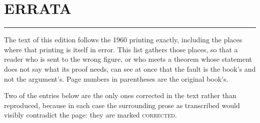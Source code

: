 \documentclass[11pt]{book}
\begin{document}
\setcounter{chapter}{18}

\chapter*{\raggedleft\Huge ERRATA}
\vspace{-1em}\noindent\rule{\linewidth}{0.6pt}\vspace{1em}

The text of this edition follows the 1960 printing exactly, including the
places where that printing is itself in error. This list gathers those
places, so that a reader who is sent to the wrong figure, or who meets a
theorem whose statement does not say what its proof needs, can see at once
that the fault is the book's and not the argument's. Page numbers in
parentheses are the original book's.

Two of the entries below are the only ones corrected in the text rather than
reproduced, because in each case the surrounding prose as transcribed would
visibly contradict the page: they are marked \textsc{corrected}.
\end{document}
